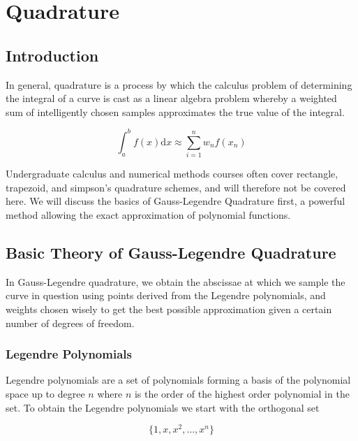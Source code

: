 


	
\chapter{Quadrature}
\label{ch:quadrature}


\section{Introduction}
\label{sec:quadratureintro}

In general, quadrature is a process by which the calculus problem of determining the integral of a curve is cast as a linear algebra problem whereby a weighted sum of intelligently chosen samples approximates the true value of the integral.

\begin{equation}\label{eqn:quadrature} \int_{a}^{b} f(x) \mathrm{d}x \approx \sum_{i=1}^n w_n f(x_n) \end{equation}

Undergraduate calculus and numerical methods courses often cover rectangle, trapezoid, and simpson's quadrature schemes, and will therefore not be covered here. We will discuss the basics of Gauss-Legendre Quadrature first, a powerful method allowing the exact approximation of polynomial functions.

\section{Basic Theory of Gauss-Legendre Quadrature}
In Gauss-Legendre quadrature, we obtain the abscissae at which we sample the curve in question using points derived from the Legendre polynomials, and weights chosen wisely to get the best possible approximation given a certain number of degrees of freedom.

\subsection{Legendre Polynomials}
Legendre polynomials are a set of polynomials forming a basis of the polynomial space up to degree $n$ where $n$ is the order of the highest order polynomial in the set. To obtain the Legendre polynomials we start with the orthogonal set

\begin{equation}  \{ 1, x, x^2, \ldots , x^n \}  \end{equation}

